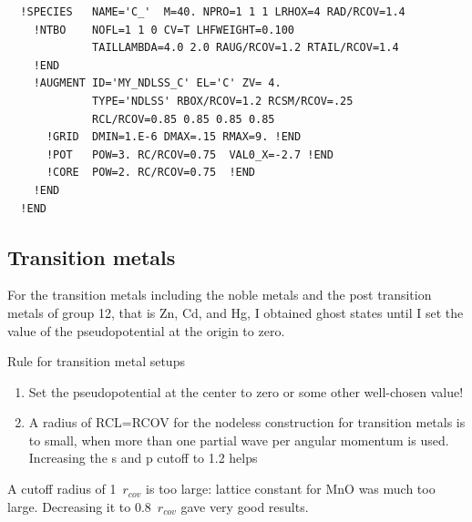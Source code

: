 \documentclass[11pt,a4paper]{report}
\begin{document}
\begin{verbatim}
  !SPECIES   NAME='C_'  M=40. NPRO=1 1 1 LRHOX=4 RAD/RCOV=1.4
    !NTBO    NOFL=1 1 0 CV=T LHFWEIGHT=0.100
             TAILLAMBDA=4.0 2.0 RAUG/RCOV=1.2 RTAIL/RCOV=1.4 
    !END 
    !AUGMENT ID='MY_NDLSS_C' EL='C' ZV= 4.
             TYPE='NDLSS' RBOX/RCOV=1.2 RCSM/RCOV=.25
             RCL/RCOV=0.85 0.85 0.85 0.85 
      !GRID  DMIN=1.E-6 DMAX=.15 RMAX=9. !END
      !POT   POW=3. RC/RCOV=0.75  VAL0_X=-2.7 !END
      !CORE  POW=2. RC/RCOV=0.75  !END
    !END
  !END
\end{verbatim}
 

\subsection{Transition metals}
For the transition metals including the noble metals and the post
transition metals of group 12, that is Zn, Cd, and Hg, I obtained
ghost states until I set the value of the pseudopotential at the
origin to zero.

\begin{myshadowminipage}{Rule for transition metal setups}
\begin{enumerate}
\item Set the pseudopotential at the center to zero or some other
  well-chosen value!
\item A radius of RCL=RCOV for the nodeless construction for
  transition metals is to small, when more than one partial wave per
  angular momentum is used. Increasing the s and p cutoff to 1.2 helps
\end{enumerate}
\end{myshadowminipage}

A cutoff radius of 1~$r_{cov}$ is too large: lattice constant for MnO
was much too large. Decreasing it to 0.8~$r_{cov}$ gave very good results.
\end{document}
